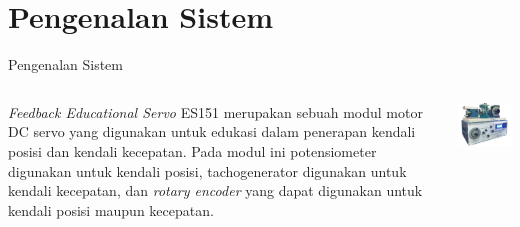 \documentclass[10pt,xcolor={dvipsnames}]{beamer}
\begin{document}
\section{Pengenalan Sistem}
	\begin{frame}{Pengenalan Sistem}
		\begin{columns}[T] %
			\begin{column}{0.48\textwidth}
			\vspace{1cm}
			\justifying \textit{Feedback Educational Servo} ES151 merupakan sebuah modul motor DC servo yang digunakan untuk edukasi dalam penerapan kendali posisi dan kendali kecepatan.
			\vspace{0.5cm}
			\newline \justifying Pada modul ini potensiometer digunakan untuk kendali posisi, tachogenerator digunakan untuk kendali kecepatan, dan \textit{rotary encoder} yang dapat digunakan untuk kendali posisi maupun kecepatan. 
			\end{column}%
			\hfill%
			\begin{column}{0.48\textwidth}
				\includegraphics[width=7.5cm]{Gambar Lain/removed bg-modul.png}
			\end{column}
		\end{columns}
	\end{frame}
\end{document}
